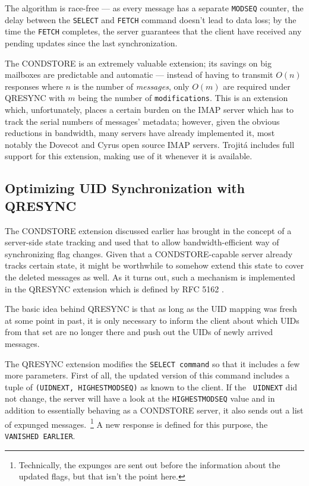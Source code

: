 \documentclass[trojita]{subfiles}
\begin{document}

The algorithm is race-free --- as every message has a separate {\tt MODSEQ} counter, the delay between the {\tt SELECT}
and {\tt FETCH} command doesn't lead to data loss; by the time the {\tt FETCH} completes, the server guarantees that the
client have received any pending updates since the last synchronization.

The CONDSTORE is an extremely valuable extension; its savings on big mailboxes are predictable and automatic --- instead
of having to transmit $O(n)$ responses where $n$ is the number of {\em messages}, only $O(m)$ are required under QRESYNC
with $m$ being the number of {\tt modifications}.  This is an extension which, unfortunately, places a certain burden on
the IMAP server which has to track the serial numbers of messages' metadata; however, given the obvious reductions in
bandwidth, many servers have already implemented it, most notably the Dovecot and Cyrus open source IMAP servers.
Trojitá includes full support for this extension, making use of it whenever it is available.

\subsection{Optimizing UID Synchronization with QRESYNC}
\label{sec:extension-qresync}

The CONDSTORE extension discussed earlier has brought in the concept of a server-side state tracking and used that to
allow bandwidth-efficient way of synchronizing flag changes.  Given that a CONDSTORE-capable server already tracks
certain state, it might be worthwhile to somehow extend this state to cover the deleted messages as well.  As it turns
out, such a mechanism is implemented in the QRESYNC extension which is defined by RFC 5162 \cite{rfc5162}.

The basic idea behind QRESYNC is that as long as the UID mapping was fresh at some point in past, it is only necessary
to inform the client about which UIDs from that set are no longer there and push out the UIDs of newly arrived messages.

The QRESYNC extension modifies the {\tt SELECT command} so that it includes a few more parameters.  First of all, the
updated version of this command includes a tuple of {\tt (UIDNEXT, HIGHESTMODSEQ)} as known to the client.  If the {\tt
UIDNEXT} did not change, the server will have a look at the {\tt HIGHESTMODSEQ} value and in addition to essentially
behaving as a CONDSTORE server, it also sends out a list of expunged messages.~\footnote{Technically, the expunges are
sent out before the information about the updated flags, but that isn't the point here.}  A new response is defined for
this purpose, the {\tt VANISHED EARLIER}.
\end{document}
